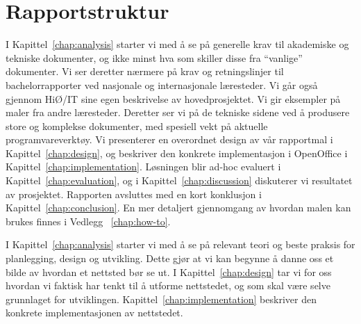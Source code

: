 \section{Rapportstruktur}


I Kapittel~\ref{chap:analysis} starter vi med å se på generelle krav til akademiske og tekniske dokumenter, og ikke minst hva som skiller disse fra ``vanlige'' dokumenter. Vi ser deretter nærmere på krav og retningslinjer til bachelorrapporter ved nasjonale og internasjonale læresteder. Vi går også gjennom HiØ/IT sine egen beskrivelse av hovedprosjektet.  Vi gir eksempler på maler fra andre læresteder. Deretter ser vi på de tekniske sidene ved å produsere store og komplekse dokumenter, med spesiell vekt på aktuelle programvareverktøy. Vi presenterer en overordnet design av vår rapportmal i Kapittel~\ref{chap:design}, og beskriver den konkrete implementasjon i OpenOffice i Kapittel~\ref{chap:implementation}. Løsningen blir ad-hoc evaluert i Kapittel~\ref{chap:evaluation}, og i Kapittel~\ref{chap:discussion} diskuterer vi resultatet av prosjektet. Rapporten avsluttes med en kort konklusjon i Kapittel~\ref{chap:conclusion}. En mer detaljert gjennomgang av hvordan malen kan brukes finnes i Vedlegg~ \ref{chap:how-to}.

I Kapittel~\ref{chap:analysis} starter vi med å se på relevant teori og beste praksis for planlegging, design og utvikling. Dette gjør at vi kan begynne å danne oss et bilde av hvordan et nettsted bør se ut. I Kapittel~\ref{chap:design} tar vi for oss hvordan vi faktisk har tenkt til å utforme nettstedet, og som skal være selve grunnlaget for utviklingen. Kapittel~\ref{chap:implementation} beskriver den konkrete implementasjonen av nettstedet. 
